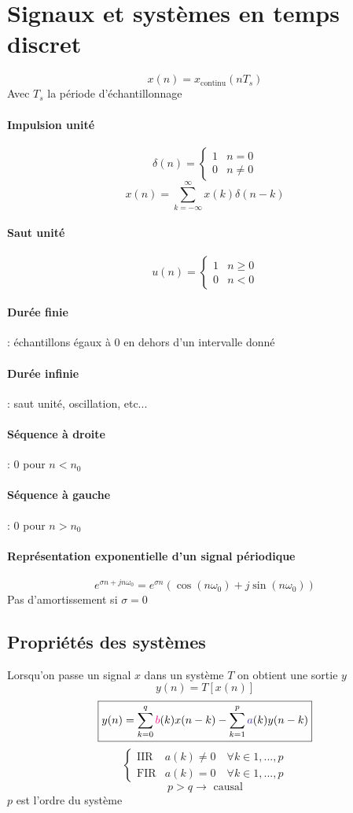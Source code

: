 \documentclass[resume]{subfiles}
\def\bcolor{\textcolor{RubineRed}}
\def\acolor{\textcolor{BlueViolet}}
\begin{document}
\section{Signaux et systèmes en temps discret}
$$x(n)=x_\text{continu}(nT_s)$$
Avec $T_s$ la période d'échantillonnage
\paragraph{Impulsion unité}
$$\delta(n)=\begin{cases}1 & n=0\\0 & n\neq 0\end{cases}$$
$$x(n)=\sum_{k=-\infty}^{\infty}x(k)\delta(n-k)$$
\paragraph{Saut unité}
$$u(n)=\begin{cases}1 & n \geq 0 \\0 & n < 0\end{cases}$$
\paragraph{Durée finie} : échantillons égaux à 0 en dehors d'un intervalle donné
\paragraph{Durée infinie} : saut unité, oscillation, etc...
\paragraph{Séquence à droite} : $0$ pour $n<n_0$
\paragraph{Séquence à gauche} : $0$ pour $n>n_0$
\paragraph{Représentation exponentielle d'un signal périodique}
$$e^{\sigma n + jn\omega_0}=e^{\sigma n}\left(\cos(n\omega_0)+j\sin(n\omega_0)\right)$$
Pas d'amortissement si $\sigma=0$
\subsection{Propriétés des systèmes}
Lorsqu'on passe un signal $x$ dans un système $T$ on obtient une sortie $y$
$$y(n)=T\left[x(n)\right]$$
$$\boxed{y(n)=\sum_{k=0}^{q}\bcolor{b}(k)x(n-k)-\sum_{k=1}^{p}\acolor{a}(k)y(n-k)}$$
$$\begin{cases}
\text{IIR} & a(k) \neq 0\quad \forall k\in 1,...,p\\
\text{FIR} & a(k) = 0\quad \forall k\in 1,...,p
\end{cases}$$
$$p>q\longrightarrow\text{ causal}$$
$p$ est l'ordre du système
\end{document}
